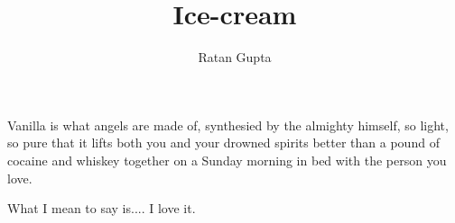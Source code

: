 \documentclass{article}
\begin{document}
\title{Ice-cream}
Vanilla is what angels are made of, synthesied by the almighty himself, so light, so pure that it lifts both you and your drowned spirits better than a pound of cocaine and whiskey together on a Sunday morning in bed with the person you love.\

What I mean to say is.... I love it. 
\author{Ratan Gupta}
\end{document}
